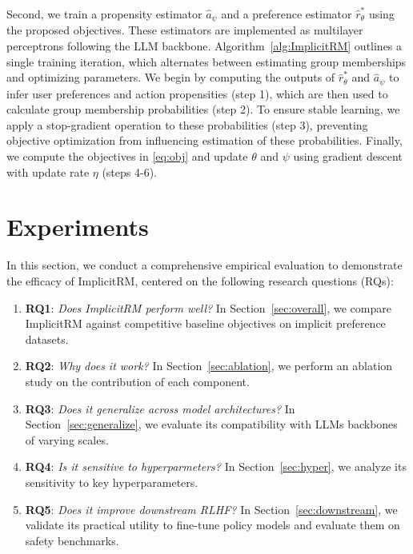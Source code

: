 \documentclass[]{arxiv_singlecolumn}
\theoremstyle{plain}
\theoremstyle{definition}
\theoremstyle{remark}
\begin{document}
Second, we train a propensity estimator $\hat{a}_\psi$ and a preference estimator $\hat{r}^*_\theta$ using the proposed objectives. These estimators are implemented as multilayer perceptrons following the LLM backbone. Algorithm~\ref{alg:ImplicitRM} outlines a single training iteration, which alternates between estimating group memberships and optimizing parameters. We begin by computing the outputs of $\hat{r}^*_\theta$ and $\hat{a}_\psi$ to infer user preferences and action propensities (step 1), which are then used to calculate group membership probabilities (step 2). To ensure stable learning, we apply a stop-gradient operation to these probabilities (step 3), preventing objective optimization from influencing estimation of these probabilities. Finally, we compute the objectives in \eqref{eq:obj} and update $\theta$ and $\psi$ using gradient descent with update rate $\eta$ (steps 4-6).

\section{Experiments}\label{sec:experiment}
In this section, we conduct a comprehensive empirical evaluation to demonstrate the efficacy of ImplicitRM, centered on the following research questions (RQs):
\begin{enumerate}[leftmargin=*]
    \item \textbf{RQ1}: \textit{Does ImplicitRM perform well?} In Section~\ref{sec:overall}, we compare ImplicitRM against competitive baseline objectives on implicit preference datasets.
    \item \textbf{RQ2}: \textit{Why does it work?} In Section~\ref{sec:ablation}, we perform an ablation study on the contribution of each component.
    \item \textbf{RQ3}: \textit{Does it generalize across model architectures?} In Section~\ref{sec:generalize}, we evaluate its compatibility with LLMs backbones of varying scales.
    \item \textbf{RQ4}: \textit{Is it sensitive to hyperparmeters?} In Section~\ref{sec:hyper}, we analyze its sensitivity to key hyperparameters.
    \item \textbf{RQ5}: \textit{Does it improve downstream RLHF?} In Section~\ref{sec:downstream}, we validate its practical utility to fine-tune policy models and evaluate them on safety benchmarks.
\end{enumerate}
\end{document}
